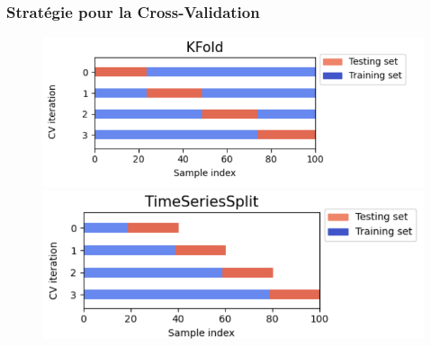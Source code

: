 \documentclass{beamer}[aspectratio = 43]
\begin{document}
\begin{frame}
	\frametitle{Stratégie pour la Cross-Validation}
		\begin{figure}[h]
			\centering
			\includegraphics[scale=0.4]{kfold}
			\includegraphics[scale=0.4]{tscv}
		\end{figure}
\end{frame}
\end{document}
